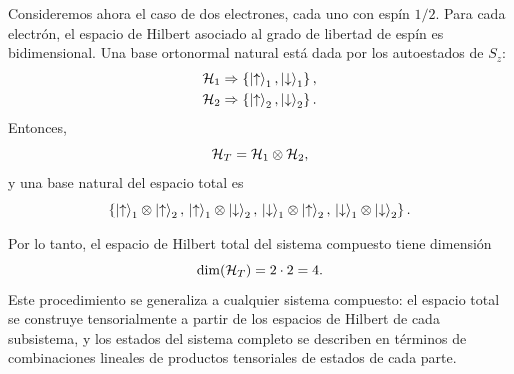 \documentclass[../main.tex]{subfiles}
\begin{document}
Consideremos ahora el caso de dos electrones, cada uno con espín $1/2$. Para cada electrón, el espacio de Hilbert asociado al grado de libertad de espín es bidimensional. Una base ortonormal natural está dada por los autoestados de $S_z$:
\begin{align*}
    \mathcal{H}_1 &\Rightarrow \left\{\ket{\uparrow}_1,\ket{\downarrow}_1\right\},\\
    \mathcal{H}_2 &\Rightarrow \left\{\ket{\uparrow}_2,\ket{\downarrow}_2\right\}.
\end{align*}
Entonces,
\begin{equation*}
    \mathcal{H}_T=\mathcal{H}_1\otimes\mathcal{H}_2,
\end{equation*}
y una base natural del espacio total es
\begin{equation*}
    \left\{
        \ket{\uparrow}_1\otimes\ket{\uparrow}_2,\,
        \ket{\uparrow}_1\otimes\ket{\downarrow}_2,\,
        \ket{\downarrow}_1\otimes\ket{\uparrow}_2,\,
        \ket{\downarrow}_1\otimes\ket{\downarrow}_2
    \right\}.
\end{equation*}

Por lo tanto, el espacio de Hilbert total del sistema compuesto tiene dimensión
\begin{equation*}
    \dim(\mathcal{H}_T)=2\cdot 2=4.
\end{equation*}
Este procedimiento se generaliza a cualquier sistema compuesto: el espacio total se construye tensorialmente a partir de los espacios de Hilbert de cada subsistema, y los estados del sistema completo se describen en términos de combinaciones lineales de productos tensoriales de estados de cada parte.
\newpage

\end{document}
